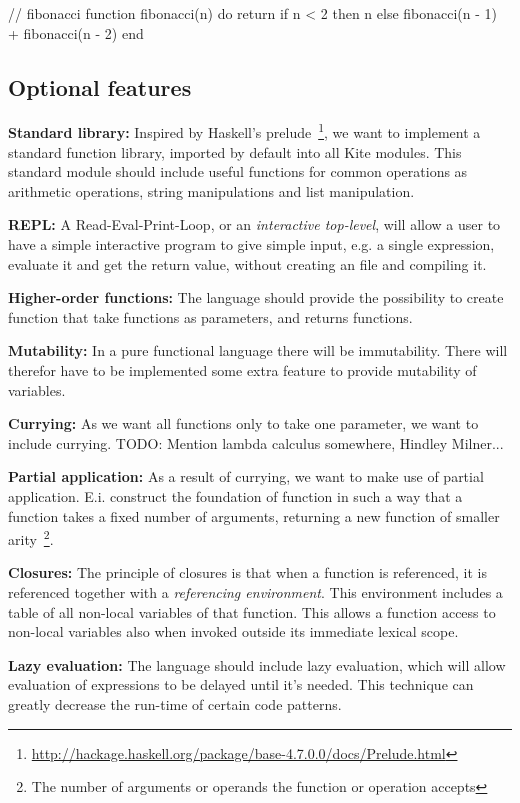 \begin{pseudo}
// fibonacci
function fibonacci(n) do
  return if n < 2
    then n
    else fibonacci(n - 1) + fibonacci(n - 2)
end
\end{pseudo}


\subsection{Optional features}

\textbf{Standard library:}
Inspired by Haskell's prelude~\footnote{\url{http://hackage.haskell.org/package/base-4.7.0.0/docs/Prelude.html}}, we want to implement a standard function library, imported by default into all Kite modules. This standard module should include useful functions for common operations as arithmetic operations, string manipulations and list manipulation.

\textbf{REPL:}
A Read-Eval-Print-Loop, or an \emph{interactive top-level}, will allow a user to have a simple interactive program to give simple input, e.g. a single expression, evaluate it and get the return value, without creating an file and compiling it.

\textbf{Higher-order functions:}
The language should provide the possibility to create function that take functions as parameters, and returns functions.

\textbf{Mutability:}
In a pure functional language there will be immutability. There will therefor have to be implemented some extra feature to provide mutability of variables.

\textbf{Currying:}
As we want all functions only to take one parameter, we want to include currying.
TODO: Mention lambda calculus somewhere, Hindley Milner...

\textbf{Partial application:}
As a result of currying, we want to make use of partial application. E.i. construct the foundation of function in such a way that a function takes a fixed number of arguments, returning a new function of smaller arity~\footnote{The number of arguments or operands the function or operation accepts}.

\textbf{Closures:}
The principle of closures is that when a function is referenced, it is referenced together with a \emph{referencing environment}. This environment includes a table of all non-local variables of that function. This allows a function access to non-local  variables also when invoked outside its immediate lexical scope.

\textbf{Lazy evaluation:}
The language should include lazy evaluation, which will allow evaluation of expressions to be delayed until it's needed. This technique can greatly decrease the run-time of certain code patterns.

